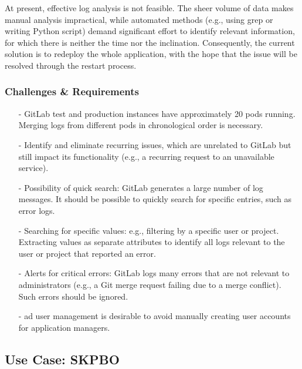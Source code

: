 \documentclass[../main.tex]{subfiles}
\begin{document}
At present, effective log analysis is not feasible. The sheer volume of data makes manual analysis impractical, while automated methods (e.g., using grep or writing Python script) demand significant effort to identify relevant information, for which there is neither the time nor the inclination. Consequently, the current solution is to redeploy the whole application, with the hope that the issue will be resolved through the restart process.

\subsubsection{Challenges \& Requirements}

\begin{enumerate}
    \item[-] GitLab test and production instances have approximately 20 pods running. Merging logs from different pods in chronological order is necessary.
    
    \item[-] Identify and eliminate recurring issues, which are unrelated to GitLab but still impact its functionality (e.g., a recurring request to an unavailable service).
    
    \item[-] Possibility of quick search: GitLab generates a large number of log messages. It should be possible to quickly search for specific entries, such as error logs.
    
    \item[-] Searching for specific values: e.g., filtering by a specific user or project. Extracting values as separate attributes to identify all logs relevant to the user or project that reported an error.
    
    \item[-] Alerts for critical errors: GitLab logs many errors that are not relevant to administrators (e.g., a Git merge request failing due to a merge conflict). Such errors should be ignored.
    
    \item[-] \gls{ad} user management is desirable to avoid manually creating user accounts for application managers.
\end{enumerate}

\subsection{Use Case: SKPBO}
\end{document}
